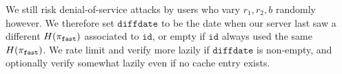 We still risk denial-of-service attacks by users who vary $r_1,r_2,b$ 
randomly however.  We therefore set $\mathtt{diffdate}$ to be the date
when our server last saw a different $H(\pi_{\mathtt{fast}})$ associated to
$\mathtt{id}$, or empty if $\mathtt{id}$ always used the same $H(\pi_{\mathtt{fast}})$.
We rate limit and verify more lazily if $\mathtt{diffdate}$ is non-empty,
and optionally verify somewhat lazily even if no cache entry exists.

